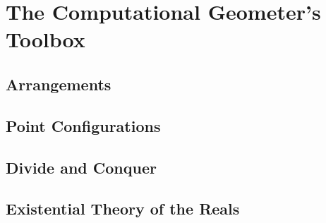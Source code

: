\part{The Computational Geometer's Toolbox}\label{sec:preliminaries}


\chapter{Arrangements}


\chapter{Point Configurations}


\chapter{Divide and Conquer}


\chapter{Existential Theory of the Reals}




